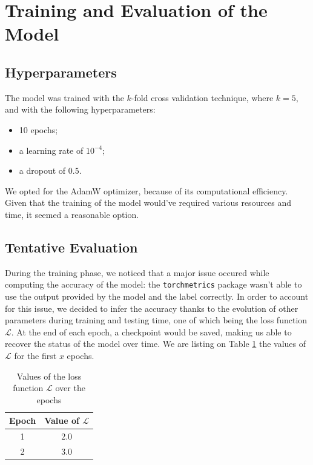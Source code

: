 \documentclass[11pt,journal]{IEEEtran}
\newcommand{\nl}{

\medskip

}
\begin{document}
\section{Training and Evaluation of the Model}

\subsection{Hyperparameters}

The model was trained with the $k$-fold cross validation technique, where $k = 5$, and with the following hyperparameters:
\begin{itemize}
    \item 10 epochs;
    \item a learning rate of $10^{-4}$;
    \item a dropout of $0.5$.
\end{itemize}

\nl We opted for the AdamW optimizer, because of its computational efficiency. Given that the training of the model would've required various resources and time, it seemed a reasonable option.

\subsection{Tentative Evaluation}

During the training phase, we noticed that a major issue occured while computing the accuracy of the model: the \texttt{torchmetrics} package wasn't able to use the output provided by the model and the label correctly. In order to account for this issue, we decided to infer the accuracy thanks to the evolution of other parameters during training and testing time, one of which being the loss function $\mathcal{L}$. At the end of each epoch, a checkpoint would be saved, making us able to recover the status of the model over time. We are listing on Table \ref{loss_values} the values of $\mathcal{L}$ for the first $x$ epochs.

\begin{table}
    \renewcommand{\arraystretch}{1.3}
    \caption{Values of the loss function $\mathcal{L}$ over the epochs}
    \label{loss_values}
    \centering
    \begin{tabular}{|c|c|}
        \hline
        \bfseries Epoch & \bfseries Value of $\mathcal{L}$ \\
        \hline\hline
        1 & 2.0\\
        \hline
        2 & 3.0 \\
        \hline
    \end{tabular}
\end{table}
\end{document}

